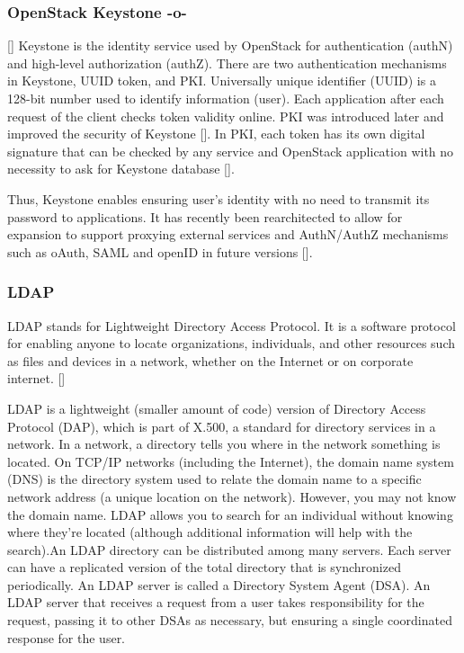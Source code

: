 \subsubsection{OpenStack Keystone -o-}
 [\cite{www-keystone-wiki}] Keystone is the identity service used by
OpenStack for authentication (authN) and high-level authorization
(authZ).  There are two authentication mechanisms in Keystone, UUID
token, and PKI.  Universally unique identifier (UUID) is a 128-bit
number used to identify information (user). Each
application after each request of the client checks token validity
online. PKI was introduced later and improved the security of
Keystone [\cite{cui2015security}]. In PKI, each token has its
own digital signature that can be checked by any service and OpenStack
application with no necessity to ask for Keystone
database [\cite{www-cloudberrylab-kstn}].
 
Thus, Keystone enables ensuring user's identity with no need to
transmit its password to applications. It has recently been
rearchitected to allow for expansion to support proxying external
services and AuthN/AuthZ mechanisms such as oAuth, SAML and openID in
future versions [\cite{www-keystone}].

\subsubsection{LDAP}

LDAP stands for Lightweight Directory Access Protocol. It is a
software protocol for enabling anyone to locate organizations,
individuals, and other resources such as files and devices in a
network, whether on the Internet or on corporate
internet. [\cite{www-ldap}]

LDAP is a lightweight (smaller amount of code) version of Directory
Access Protocol (DAP), which is part of X.500, a standard for
directory services in a network.  In a network, a directory tells you
where in the network something is located. On TCP/IP networks
(including the Internet), the domain name system (DNS) is the
directory system used to relate the domain name to a specific network
address (a unique location on the network). However, you may not know
the domain name. LDAP allows you to search for an individual without
knowing where they're located (although additional information will
help with the search).An LDAP directory can be distributed among many
servers. Each server can have a replicated version of the total
directory that is synchronized periodically.  An LDAP server is called
a Directory System Agent (DSA). An LDAP server that receives a request
from a user takes responsibility for the request, passing it to other
DSAs as necessary, but ensuring a single coordinated response for the
user.

